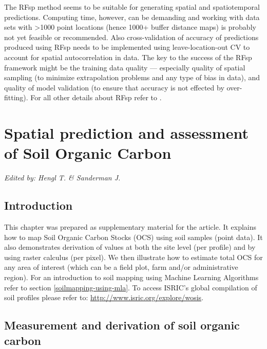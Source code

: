 \documentclass[graybox,natbib,nospthms,UStrade]{svmono}
\begin{document}
The RFsp method seems to be suitable for generating spatial and spatiotemporal predictions.
Computing time, however, can be demanding and working with data sets with \textgreater{}1000
point locations (hence 1000+ buffer distance maps) is probably not yet feasible or recommended.
Also cross-validation of accuracy of predictions produced using RFsp needs to be
implemented using leave-location-out CV to account for spatial autocorrelation in data.
The key to the success of the RFsp framework might be the training data quality ---
especially quality of spatial sampling (to minimize extrapolation problems and any
type of bias in data), and quality of model validation (to ensure that accuracy is
not effected by over-fitting). For all other details about RFsp refer to \citet{Hengl2018RFsp}.

\hypertarget{SOC-chapter}{%
\chapter{Spatial prediction and assessment of Soil Organic Carbon}\label{SOC-chapter}}

\emph{Edited by: Hengl T. \& Sanderman J.}

\hypertarget{introduction-2}{%
\section{Introduction}\label{introduction-2}}

This chapter was prepared as supplementary material for the \citet{sanderman2018soil} article. It explains how to map Soil Organic Carbon Stocks (OCS) using soil samples (point data). It also demonstrates derivation of values at both the site level (per profile) and by using raster calculus (per pixel). We then illustrate how to estimate total OCS for any area of interest (which can be a field plot, farm and/or administrative region). For an introduction to soil mapping using Machine Learning Algorithms refer to section \ref{soilmapping-using-mla}. To access ISRIC's global compilation of soil profiles please refer to: \url{http://www.isric.org/explore/wosis}.

\hypertarget{measurement-and-derivation-of-soil-organic-carbon}{%
\section{Measurement and derivation of soil organic carbon}\label{measurement-and-derivation-of-soil-organic-carbon}}
\end{document}
